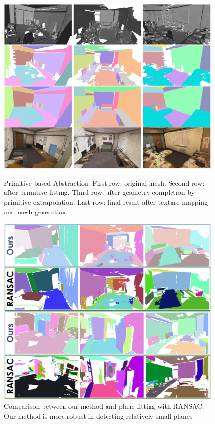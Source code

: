 \begin{figure}
\begin{minipage}{0.49\linewidth}
\centering
\includegraphics[width=\linewidth]{3dlite/fig15.png}
\caption{Primitive-based Abstraction. First row: original mesh. Second row: after primitive fitting. Third row: after geometry completion by primitive extrapolation. Last row: final result after texture mapping and mesh generation.}
\label{fig:3dlite-eval-plane}
\end{minipage}
\begin{minipage}{0.49\linewidth}
\centering
\includegraphics[width=\linewidth]{3dlite/fig16.png}
\caption{Comparison between our method and plane fitting with RANSAC.  Our method is more robust in detecting relatively small planes.}
\label{fig:3dlite-eval-fitting}
\end{minipage}
\end{figure}

